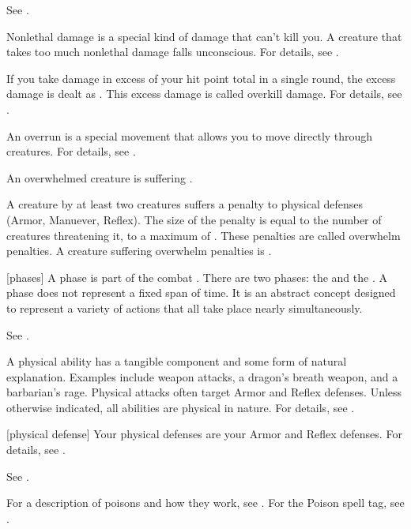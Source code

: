  See .

 Nonlethal damage is a special kind of damage that can't kill you.
A creature that takes too much nonlethal damage falls unconscious.
For details, see .

 If you take damage in excess of your  hit point total in a single round, the excess damage is dealt as .
This excess damage is called overkill damage.
For details, see .

 An overrun is a special movement that allows you to move directly through creatures.
For details, see .

 An overwhelmed creature is suffering .

 A creature  by at least two creatures suffers a penalty to physical defenses (Armor, Manuever, Reflex).
The size of the penalty is equal to the number of creatures threatening it, to a maximum of .
These penalties are called overwhelm penalties.
A creature suffering overwhelm penalties is .

[phases] A phase is part of the combat .
There are two phases: the  and the .
A phase does not represent a fixed span of time.
It is an abstract concept designed to represent a variety of actions that all take place nearly simultaneously.

 See .

 A physical ability has a tangible component and some form of natural explanation.
Examples include weapon attacks, a dragon's breath weapon, and a barbarian's rage.
Physical attacks often target Armor and Reflex defenses.
Unless otherwise indicated, all abilities are physical in nature.
For details, see .

[physical defense] Your physical defenses are your Armor and Reflex defenses.
For details, see .

 See .

 For a description of poisons and how they work, see . For the Poison spell tag, see .

